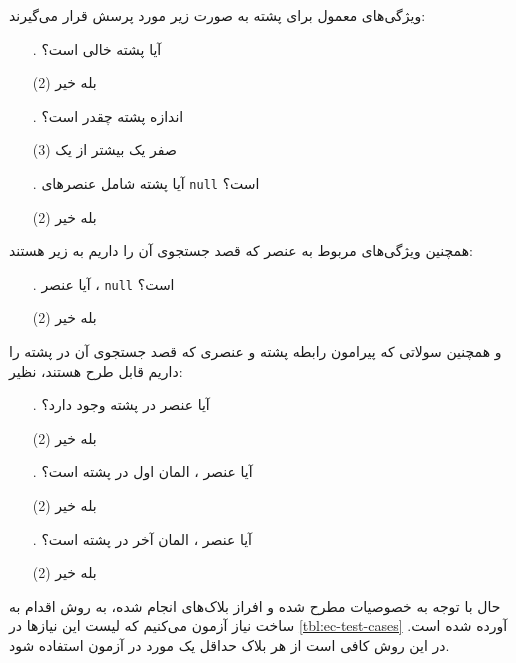 \documentclass[twoside]{article}
\newenvironment{answer}{}{\medskip}
\begin{document}
\begin{answer}
ویژگی‌های معمول برای پشته به صورت زیر مورد پرسش قرار می‌گیرند:
\begin{enumerate}
	\item[\lr{\textbf{A}}.]
آیا پشته خالی است؟
	\begin{tasks}(2)
		\task[\lr{1}. ]
بله
		\task[\lr{2}. ]
خیر
	\end{tasks}
	\item[\lr{\textbf{B}}.]
اندازه پشته چقدر است؟
	\begin{tasks}(3)
		\task[\lr{1}. ]
صفر
		\task[\lr{2}. ]
یک
		\task[\lr{3}. ]
بیشتر از یک
	\end{tasks}
	\item[\lr{\textbf{C}}.]
آیا پشته شامل عنصرهای \texttt{null} است؟
	\begin{tasks}(2)
		\task[\lr{1}. ]
بله
		\task[\lr{2}. ]
خیر
	\end{tasks}
\end{enumerate}
همچنین ویژگی‌های مربوط به عنصر که قصد جستجوی آن را داریم به زیر هستند:
\begin{enumerate}[label=.\Alph*]
	\item[\lr{\textbf{D}}.]
آیا عنصر ، \texttt{null} است؟
	\begin{tasks}(2)
		\task[\lr{1}. ]
بله
		\task[\lr{2}. ]
خیر
	\end{tasks}
\end{enumerate}
و همچنین سولاتی که پیرامون رابطه پشته و عنصری که قصد جستجوی آن در پشته را داریم قابل طرح هستند، نظیر:
\begin{enumerate}[label=.\Alph*]
	\item[\lr{\textbf{E}}.]
آیا عنصر  در پشته وجود دارد؟
	\begin{tasks}(2)
		\task[\lr{1}. ]
بله
		\task[\lr{2}. ]
خیر
	\end{tasks}
	\item[\lr{\textbf{F}}.]
آیا عنصر ، المان اول در پشته است؟
	\begin{tasks}(2)
		\task[\lr{1}. ]
بله
		\task[\lr{2}. ]
خیر
	\end{tasks}
	\item[\lr{\textbf{G}}.]
آیا عنصر ، المان آخر در پشته است؟
	\begin{tasks}(2)
		\task[\lr{1}. ]
بله
		\task[\lr{2}. ]
خیر
	\end{tasks}
\end{enumerate}
حال با توجه به خصوصیات مطرح شده و افراز بلاک‌های انجام شده، به روش %
اقدام به ساخت نیاز آزمون می‌کنیم که لیست این نیازها در \autoref{tbl:ec-test-cases} آورده شده است. در این روش کافی است از هر بلاک حداقل یک مورد در آزمون استفاده شود.


\end{answer}
\end{document}
